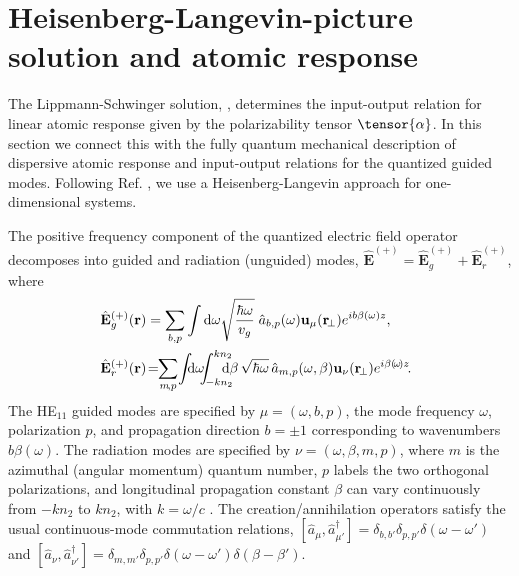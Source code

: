 \documentclass[aps,pra,twocolumn]{revtex4-1} %
\newcommand{\awg}{\hat{a}_{b,p}(\omega)}
\newcommand{\awr}{\hat{a}_{m,p}(\omega,\beta)}
\begin{document}
\section{Heisenberg-Langevin-picture solution and atomic response} \label{Sec::HeisenbergLangevin}
	
The Lippmann-Schwinger solution, , determines the input-output relation for linear atomic response given by the polarizability tensor $\tensor{\alpha}$.  
In this section we connect this with the fully quantum mechanical description of dispersive atomic response and input-output relations for the quantized guided modes.  
Following Ref. \cite{le_kien_spontaneous_2005}, we use a Heisenberg-Langevin approach for one-dimensional systems.  

The positive frequency component of the quantized electric field operator decomposes into guided and radiation (unguided) modes, $\hat{\mathbf{E}}^{(+)}=\hat{\mathbf{E}}_g^{(+)}+\hat{\mathbf{E}}_{r}^{(+)}$, where
	\begin{align}
		\!\!\!\hat{\mathbf{E}}_g^{(+)}(\br) &= \sum_{b,p} \int \mathrm{d}\omega  \sqrt{\frac{ \hbar \omega}{ v_g}} \; \awg \mathbf{u}_\mu (\br\!_\perp) e^{i b\beta(\omega) z } ,\label{Eq::QuantizedElectricField} \\
		\!\!\!\hat{\mathbf{E}}_r^{(+)}(\br) &\!=\!\! \sum_{m\!,p}\! \int\!\!\! \mathrm{d}\omega\!\!\!   \int_{\!-kn_2}^{kn_2}\!\!\!\!\!\!\mathrm{d}\beta \, \sqrt{ \hbar \omega}\,\awr \mathbf{u}_\nu (\br\!_\perp) e^{i\beta(\!\omega\!) z }\!.
	\end{align}
The HE$_{11}$ guided modes are specified by $\mu =(\omega, b, p)$, the mode frequency $\omega$,  polarization $p$, and propagation direction $b=\pm1$ corresponding to wavenumbers $b \beta (\omega)$.  
The radiation modes are specified by  $\nu=(\omega, \beta, m, p)$, where $m$ is the azimuthal (angular momentum) quantum number, $p$ labels the two orthogonal polarizations, and longitudinal propagation constant $\beta$ can vary continuously from $-kn_2$ to $kn_2$, with $k = \omega/c$ \cite{sondergaard_general_2001,le_kien_spontaneous_2005}.  
The creation/annihilation operators satisfy the usual continuous-mode commutation relations, $[\hat{a}_\mu, \hat{a}^\dag_{\mu'} ] = \delta_{b,b'} \delta_{p,p'} \delta ( \omega - \omega ') $ and $[\hat{a}_\nu ,\hat{a}^\dag_{\nu'} ] = \delta_{m,m'} \delta_{p,p'} \delta ( \omega - \omega ')  \delta ( \beta - \beta') $.
\end{document}
